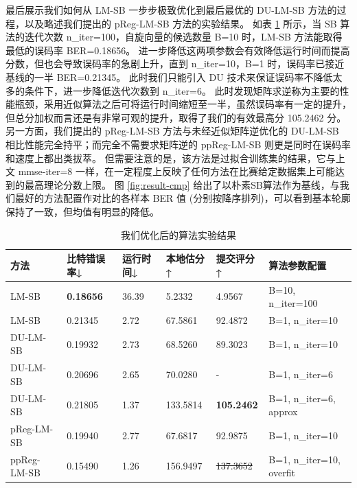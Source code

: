 \documentclass[withoutpreface,bwprint]{cumcmthesis}
\begin{document}
最后展示我们如何从 LM-SB 一步步极致优化到最后最优的 DU-LM-SB 方法的过程，以及略述我们提出的 pReg-LM-SB 方法的实验结果。
如表 \ref{tbl:result} 所示，当 SB 算法的迭代次数 n\_iter=100，自旋向量的候选数量 B=10 时，LM-SB 方法能取得最低的误码率 BER=0.18656。
进一步降低这两项参数会有效降低运行时间而提高分数，但也会导致误码率的急剧上升，直到 n\_iter=10，B=1 时，误码率已接近基线的一半 BER=0.21345。
此时我们只能引入 DU 技术来保证误码率不降低太多的条件下，进一步降低迭代次数到 n\_iter=6。
此时发现矩阵求逆称为主要的性能瓶颈，采用近似算法之后可将运行时间缩短至一半，虽然误码率有一定的提升，但总分加权而言还是有非常可观的提升，取得了我们的有效最高分 105.2462 分。
另一方面，我们提出的 pReg-LM-SB 方法与未经近似矩阵逆优化的 DU-LM-SB 相比性能完全持平；而完全不需要求矩阵逆的 ppReg-LM-SB 则更是同时在误码率和速度上都出类拔萃。
但需要注意的是，该方法是过拟合训练集的结果，它与上文 mmse-iter=8 一样，在一定程度上反映了任何方法在比赛给定数据集上可能达到的最高理论分数上限。
图 \ref{fig:result-cmp} 给出了以朴素SB算法作为基线，与我们最好的方法配置作对比的各样本 BER 值 (分别按降序排列)，可以看到基本轮廓保持了一致，但均值有明显的降低。

\begin{table}[h!]
	\centering
	\caption{我们优化后的算法实验结果}
	\begin{tabular}{llllll}
		\textbf{方法} & \textbf{比特错误率↓} & \textbf{运行时间↓} & \textbf{本地估分↑} & \textbf{提交评分↑} & \textbf{算法参数配置} \\
		\hline
		LM-SB & \textbf{0.18656} &  36.39 &  5.2332 &  4.9567 & B=10, n\_iter=100 \\
		LM-SB & 0.21345 & 2.72 & 67.5861 & 92.4872 & B=1, n\_iter=10 \\
		DU-LM-SB & 0.19932 & 2.73 & 68.5260 & 89.3023 & B=1, n\_iter=10 \\
		DU-LM-SB & 0.20696 & 2.65 & 70.0280 & - & B=1, n\_iter=6 \\
		DU-LM-SB & 0.21805 & 1.37 & 133.5814 & \textbf{105.2462} & B=1, n\_iter=6, approx \\
		pReg-LM-SB & 0.19940 & 2.77 & 67.6817 & 92.9875 & B=1, n\_iter=10 \\
		ppReg-LM-SB & 0.15490 & 1.26 & 156.9497 & \sout{137.3652} & B=1, n\_iter=10, overfit \\
	\end{tabular}
	\label{tbl:result}
\end{table}
\end{document}
